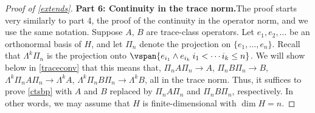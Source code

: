 \documentclass[12pt]{amsart}
\begin{document}
\begin{proof}[Proof of \cref{extends}]
\textbf{Part 6: Continuity in the trace norm.}The proof starts very similarly to part 4, the proof of the continuity in the operator norm, and we use the same notation. Suppose $A$, $B$ are trace-class operators. Let $e_1,e_2,\ldots$ be an orthonormal basis of $H$, and let $\Pi_n$ denote the projection on $\{e_1,\ldots,e_n\}$. Recall that $\Lambda^k \Pi_n$ is the projection onto $\vspan\{e_{i_1}\wedge e_{i_k}\: i_1 < \cdots i_k \leq n\}$. We will show below in \cref{traceconv} that this means that, $\Pi_n A \Pi_n \to A$, $\Pi_n B \Pi_n \to B$, $\Lambda^k \Pi_n A \Pi_n \to \Lambda^k A$, $\Lambda^k \Pi_n B \Pi_n \to \Lambda^k B$, all in the trace norm. Thus, it suffices to prove \eqref{ctsbp} with $A$ and $B$ replaced by $\Pi_n A\Pi_n$ and $\Pi_n B \Pi_n$, respectively. In other words, we may assume that $H$ is finite-dimensional with $\dim H = n$.


\end{proof}
\end{document}
